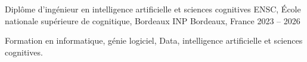 
\begin{cventries}
  \cventry
    {Diplôme d’ingénieur en intelligence artificielle et sciences cognitives}
    {ENSC, École nationale supérieure de cognitique, Bordeaux INP}
    {Bordeaux, France}
    {2023 -- 2026}
    {
      \begin{cvitems}
        \item {Formation en informatique, génie logiciel, Data, intelligence artificielle et sciences cognitives.}
      \end{cvitems}
    }
\end{cventries}
